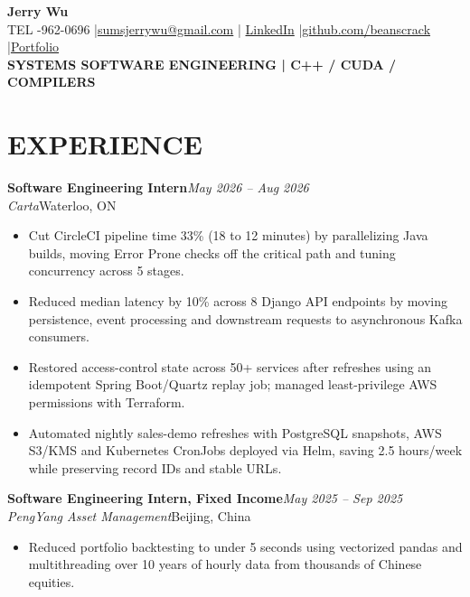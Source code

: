 \documentclass[11pt,letterpaper]{article}
\begin{document}
\begin{center}
  {\fontsize{16.7}{18}\selectfont\bfseries Jerry Wu}\\[-1pt]
  {\footnotesize TEL -962-0696 \enspace|\enspace \href{mailto:sumsjerrywu@gmail.com}{sumsjerrywu@gmail.com} \enspace|\enspace
  \href{https://www.linkedin.com/in/jerry-wu-03210a30b/}{LinkedIn} \enspace|\enspace \href{https://github.com/beanscrack}{github.com/beanscrack} \enspace|\enspace \href{https://website-beta-seven-81.vercel.app/}{Portfolio}}\\[1pt]
  {\fontsize{8.1}{9}\selectfont\bfseries SYSTEMS SOFTWARE ENGINEERING  |  C++ / CUDA / COMPILERS}
\end{center}
\vspace{-5pt}
\section*{EXPERIENCE}
\noindent\textbf{Software Engineering Intern}\hfill \textit{May 2026 -- Aug 2026}\\
\textit{Carta}\hfill Waterloo, ON\par
\begin{itemize}
\item Cut CircleCI pipeline time 33\% (18 to 12 minutes) by parallelizing Java builds, moving Error Prone checks off the critical path and tuning concurrency across 5 stages.
\item Reduced median latency by 10\% across 8 Django API endpoints by moving persistence, event processing and downstream requests to asynchronous Kafka consumers.
\item Restored access-control state across 50+ services after refreshes using an idempotent Spring Boot/Quartz replay job; managed least-privilege AWS permissions with Terraform.
\item Automated nightly sales-demo refreshes with PostgreSQL snapshots, AWS S3/KMS and Kubernetes CronJobs deployed via Helm, saving 2.5 hours/week while preserving record IDs and stable URLs.
\end{itemize}
\noindent\textbf{Software Engineering Intern, Fixed Income}\hfill \textit{May 2025 -- Sep 2025}\\
\textit{PengYang Asset Management}\hfill Beijing, China\par
\begin{itemize}
\item Reduced portfolio backtesting to under 5 seconds using vectorized pandas and multithreading over 10 years of hourly data from thousands of Chinese equities.
\end{itemize}
\end{document}

